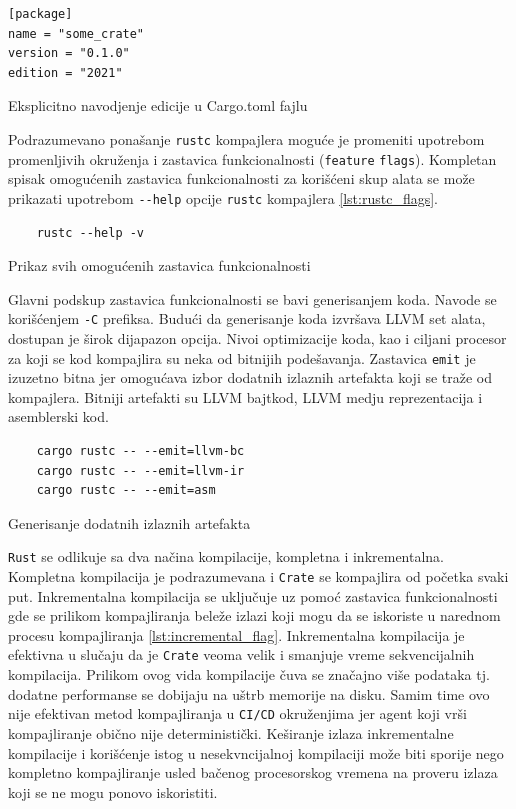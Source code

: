 \documentclass[11pt]{article}
\begin{document}
\begin{listing}[h]
\begin{verbatim}
[package]
name = "some_crate"
version = "0.1.0"
edition = "2021"

\end{verbatim}
\caption{Eksplicitno navodjenje edicije u Cargo.toml fajlu}
\label{lst:edition_toml}
\end{listing}

\newpage


Podrazumevano ponašanje \verb|rustc| kompajlera moguće je promeniti upotrebom promenljivih okruženja 
i zastavica funkcionalnosti (\verb|feature| \verb|flags|). Kompletan spisak omogućenih zastavica funkcionalnosti 
za korišćeni skup alata se može prikazati upotrebom \verb|--help| opcije \verb|rustc| kompajlera \ref{lst:rustc_flags}.

\begin{listing}[H]
\begin{verbatim}
    rustc --help -v 
\end{verbatim}
\caption{Prikaz svih omogućenih zastavica funkcionalnosti}
\label{lst:rustc_flags}
\end{listing}

Glavni podskup zastavica funkcionalnosti se bavi generisanjem koda. Navode se korišćenjem \verb|-C| prefiksa. 
Budući da generisanje koda izvršava 
LLVM set alata, dostupan je širok dijapazon opcija. Nivoi optimizacije koda, kao i ciljani procesor za koji 
se kod kompajlira su neka od bitnijih podešavanja. Zastavica \verb|emit| je izuzetno bitna jer omogućava izbor 
dodatnih izlaznih artefakta koji se traže od kompajlera. Bitniji artefakti su LLVM bajtkod, LLVM medju 
reprezentacija i asemblerski kod.

\begin{listing}[H]
\begin{verbatim}
    cargo rustc -- --emit=llvm-bc
    cargo rustc -- --emit=llvm-ir
    cargo rustc -- --emit=asm
\end{verbatim}
\caption{Generisanje dodatnih izlaznih artefakta}
\label{lst:emit_flag}
\end{listing}


\verb|Rust| se odlikuje sa dva načina kompilacije, kompletna 
i inkrementalna. Kompletna kompilacija je podrazumevana i \verb|Crate| se kompajlira od početka svaki put.
Inkrementalna kompilacija se uključuje uz pomoć zastavica funkcionalnosti gde se prilikom kompajliranja 
beleže izlazi koji mogu da se iskoriste u narednom procesu kompajliranja \ref{lst:incremental_flag}. Inkrementalna kompilacija je 
efektivna u slučaju da je \verb|Crate| veoma velik i smanjuje vreme sekvencijalnih kompilacija. Prilikom ovog 
vida kompilacije čuva se značajno više podataka tj. dodatne performanse se dobijaju na uštrb memorije na disku.
Samim time ovo nije efektivan metod kompajliranja u \verb|CI/CD| okruženjima jer agent koji vrši kompajliranje
obično nije deterministički. Keširanje izlaza inkrementalne kompilacije i korišćenje istog u nesekvncijalnoj 
kompilaciji može biti sporije nego kompletno kompajliranje usled bačenog procesorskog vremena na proveru 
izlaza koji se ne mogu ponovo iskoristiti.
\end{document}
